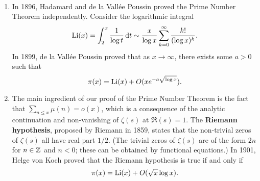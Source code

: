 \begin{remark}~
    \begin{enumerate}[(1)]
        \item In 1896, Hadamard and de la Vall\'ee Poussin proved the Prime 
        Number Theorem independently. Consider the logarithmic integral 
        \[ \operatorname{Li}(x) = \int_2^x \frac{1}{\log t}\,\mathrm{d} t \sim \frac{x}{\log x} 
        \sum_{k=0}^\infty \frac{k!}{(\log x)^k}. \] 
        In 1899, de la Vall\'ee Poussin proved that as $x \to \infty$, there 
        exists some $a > 0$ such that 
        \[ \pi(x) = \operatorname{Li}(x) + O(xe^{-a\sqrt{\log x}}). \]
        \item The main ingredient of our proof of the Prime Number Theorem is the 
        fact that $\sum_{n\leq x} \mu(n) = o(x)$, which is a consequence of the 
        analytic continuation and non-vanishing of $\zeta(s)$ at $\Re(s) = 1$. 
        The {\bf Riemann hypothesis}, proposed by Riemann in 1859, states that 
        the non-trivial zeros of $\zeta(s)$ all have real part $1/2$. 
        (The trivial zeros of $\zeta(s)$ are of the form $2n$ for $n \in \mathbb{Z}$ and 
        $n < 0$; these can be obtained by functional equations.) In 1901, Helge von 
        Koch proved that the Riemann hypothesis is true if and only if 
        \[ \pi(x) = \operatorname{Li}(x) + O(\sqrt x \log x). \] 
    \end{enumerate}
\end{remark}
